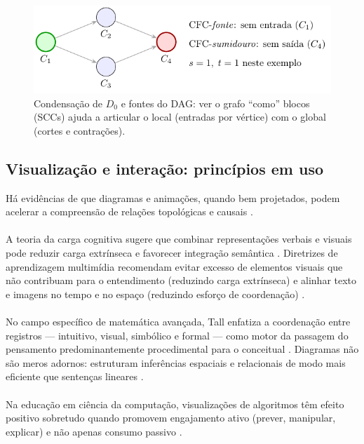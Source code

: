 \documentclass[12pt,a4paper]{article}
\def\emph#1{#1}%
\begin{document}
\begin{figure}[H]
    \centering
    \includegraphics[width=.72\linewidth]{figures/fig_condensado_st.pdf}
    \caption{Condensação de $D_0$ e fontes do DAG: ver o grafo “como” blocos (SCCs) ajuda a articular o local (entradas por vértice) com o global (cortes e contrações).}
    \label{fig:didatica-condensado}
\end{figure}

\subsection{Visualização e interação: princípios em uso}
Há evidências de que diagramas e animações, quando bem projetados, podem acelerar a compreensão de relações topológicas e causais \cite{larkin1987diagram,ware2012information}.

\paragraph{}
A teoria da carga cognitiva sugere que combinar representações verbais e visuais pode reduzir carga extrínseca e favorecer integração semântica \cite{mayer2009multimedia,paivio1990}. Diretrizes de aprendizagem multimídia recomendam evitar excesso de elementos visuais que não contribuam para o entendimento (reduzindo carga extrínseca) e alinhar texto e imagens no tempo e no espaço (reduzindo esforço de coordenação) \cite{mayer2009multimedia}.

\paragraph{}
No campo específico de matemática avançada, Tall enfatiza a coordenação entre registros — intuitivo, visual, simbólico e formal — como motor da passagem do pensamento predominantemente procedimental para o conceitual \cite{tall1991advanced}. Diagramas não são meros adornos: estruturam inferências espaciais e relacionais de modo mais eficiente que sentenças lineares \cite{larkin1987diagram}.


\paragraph{}
Na educação em ciência da computação, visualizações de algoritmos têm efeito positivo sobretudo quando promovem \emph{engajamento ativo} (prever, manipular, explicar) e não apenas consumo passivo \cite{hundhausen2002meta,naps2003engagement}.
\end{document}
